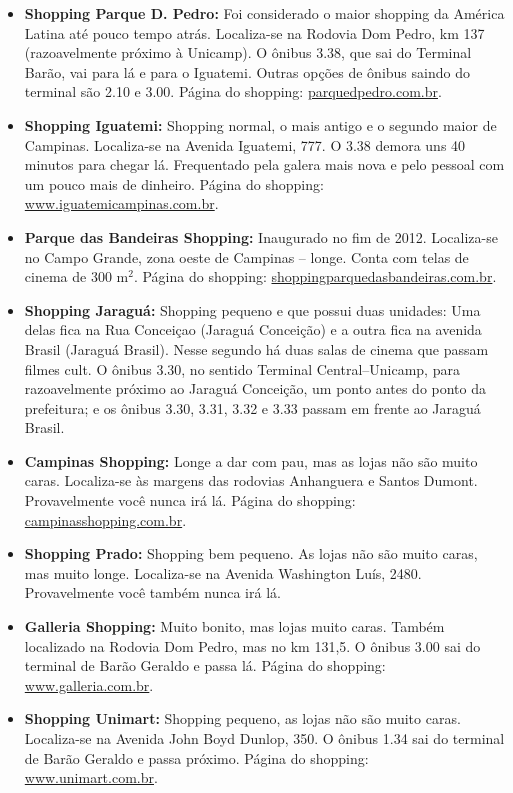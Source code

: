 \begin{itemize}

\item   \textbf{Shopping Parque D. Pedro:} Foi considerado o maior shopping da
    América Latina até pouco tempo atrás. Localiza-se na Rodovia Dom Pedro, km
    137 (razoavelmente próximo à Unicamp). O ônibus 3.38, que sai do Terminal
    Barão, vai para lá e para o Iguatemi. Outras opções de ônibus saindo do
    terminal são 2.10 e 3.00. Página do shopping: \url{parquedpedro.com.br}.

\item   \textbf{Shopping Iguatemi:} Shopping normal, o mais antigo e o segundo
    maior de Campinas. Localiza-se na Avenida Iguatemi, 777. O 3.38 demora uns
    40 minutos para chegar lá. Frequentado pela galera mais nova e pelo pessoal
    com um pouco mais de dinheiro. Página do shopping:
    \url{www.iguatemicampinas.com.br}.

\item   \textbf{Parque das Bandeiras Shopping:} Inaugurado no fim de 2012.
    Localiza-se no Campo Grande, zona oeste de Campinas -- longe. Conta com
    telas de cinema de 300 m$^{2}$. Página do shopping:
    \url{shoppingparquedasbandeiras.com.br}.

\item   \textbf{Shopping Jaraguá:} Shopping pequeno e que possui duas unidades:
    Uma delas fica na Rua Conceiçao (Jaraguá Conceição) e a outra fica na
    avenida Brasil (Jaraguá Brasil). Nesse segundo há duas salas de cinema que
    passam filmes cult. O ônibus 3.30, no sentido Terminal Central--Unicamp,
    para razoavelmente próximo ao Jaraguá Conceição, um ponto antes do ponto da
    prefeitura; e os ônibus 3.30, 3.31, 3.32 e 3.33 passam em frente ao Jaraguá
    Brasil.

\item   \textbf{Campinas Shopping:} Longe a dar com pau, mas as lojas não são
    muito caras. Localiza-se às margens das rodovias Anhanguera e Santos Dumont.
    Provavelmente você nunca irá lá. Página do shopping:
    \url{campinasshopping.com.br}.

\item   \textbf{Shopping Prado:} Shopping bem pequeno. As lojas não são muito
    caras, mas muito longe. Localiza-se na Avenida Washington Luís, 2480.
    Provavelmente você também nunca irá lá.

\item   \textbf{Galleria Shopping:} Muito bonito, mas lojas muito caras. Também
    localizado na Rodovia Dom Pedro, mas no km 131,5. O ônibus 3.00 sai do
    terminal de Barão Geraldo e passa lá. Página do shopping:
    \url{www.galleria.com.br}.

\item   \textbf{Shopping Unimart:} Shopping pequeno, as lojas não são muito
    caras. Localiza-se na Avenida John Boyd Dunlop, 350. O ônibus 1.34 sai do
    terminal de Barão Geraldo e passa próximo. Página do shopping:
    \url{www.unimart.com.br}.

\end{itemize}
